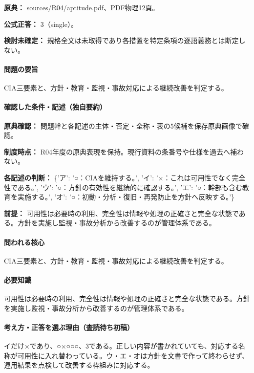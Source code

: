 \noindent\textbf{原典：} sources/R04/aptitude.pdf、PDF物理12頁。

\textbf{公式正答：} 3（single）。

\par\textbf{検討未確定：} 規格全文は未取得であり各措置を特定条項の逐語義務とは断定しない。

\paragraph{問題の要旨} CIA三要素と、方針・教育・監視・事故対応による継続改善を判定する。

\paragraph{確認した条件・記述（独自要約）}\mbox{}\par

\noindent\textbf{原典確認：} 問題幹と各記述の主体・否定・全称・表の5候補を保存原典画像で確認。\par

\noindent\textbf{制度時点：} R04年度の原典表現を保持。現行資料の条番号や仕様を過去へ補わない。\par

\noindent\textbf{各記述の判断：} \{'ア': '○：CIAを維持する。', 'イ': '×：これは可用性でなく完全性である。', 'ウ': '○：方針の有効性を継続的に確認する。', 'エ': '○：幹部も含む教育を実施する。', 'オ': '○：初動・分析・復旧・再発防止を方針へ反映する。'\}\par

\noindent\textbf{前提：} 可用性は必要時の利用、完全性は情報や処理の正確さと完全な状態である。方針を実施し監視・事故分析から改善するのが管理体系である。\par

\paragraph{問われる核心} CIA三要素と、方針・教育・監視・事故対応による継続改善を判定する。

\paragraph{必要知識} 可用性は必要時の利用、完全性は情報や処理の正確さと完全な状態である。方針を実施し監視・事故分析から改善するのが管理体系である。

\paragraph{考え方・正答を選ぶ理由（査読待ち初稿）} イだけ×であり、○×○○○、3である。正しい内容が書かれていても、対応する名称が可用性に入れ替わっている。ウ・エ・オは方針を文書で作って終わらせず、運用結果を点検して改善する枠組みに対応する。

